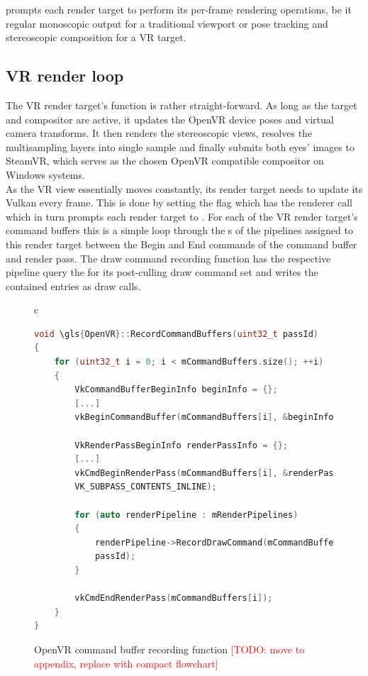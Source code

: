  prompts each render target to perform its per-frame rendering operations, be it regular monoscopic output for a traditional viewport or pose tracking and stereoscopic composition for a \gls{VR} target. 

\subsection{VR render loop}
The \gls{VR} render target's  function is rather straight-forward. 
As long as the target and compositor are active, it updates the \gls{OpenVR} device poses and virtual camera transforms. It then renders the stereoscopic views, resolves the multisampling layers into single sample and finally submits both eyes' images to SteamVR, which serves as the chosen \gls{OpenVR} compatible compositor on Windows systems. \\

As the \gls{VR} view essentially moves constantly, its render target needs to update its Vulkan  every frame. This is done by setting the  flag which has the renderer call  which in turn prompts each render target to . For each of the \gls{VR} render target's command buffers this is a simple loop through the s of the pipelines assigned to this render target between the Begin and End commands of the command buffer and render pass. The draw command recording function has the respective pipeline query the  for its post-culling draw command set and writes the contained entries as  draw calls. 

\begin{figure}[htb]
  \centering
  \begin{tabular}{c}
  \begin{lstlisting}[language=C++]
void \gls{OpenVR}::RecordCommandBuffers(uint32_t passId)
{
	for (uint32_t i = 0; i < mCommandBuffers.size(); ++i)
	{
		VkCommandBufferBeginInfo beginInfo = {};
		[...]
		vkBeginCommandBuffer(mCommandBuffers[i], &beginInfo);

		VkRenderPassBeginInfo renderPassInfo = {};
		[...]
		vkCmdBeginRenderPass(mCommandBuffers[i], &renderPassInfo, 
		VK_SUBPASS_CONTENTS_INLINE);

		for (auto renderPipeline : mRenderPipelines)
		{
			renderPipeline->RecordDrawCommand(mCommandBuffers[i], 
			passId);
		}

		vkCmdEndRenderPass(mCommandBuffers[i]);
	}
}
	\end{lstlisting}
  \end{tabular}
  \caption[\gls{OpenVR} render target's RecordCommandBuffers]{\gls{OpenVR} command buffer recording function \textcolor{red}{[TODO: move to appendix, replace with compact flowchart]}}\label{fig:lst_OpenVR_RecordCommandBuffers}
\end{figure}

